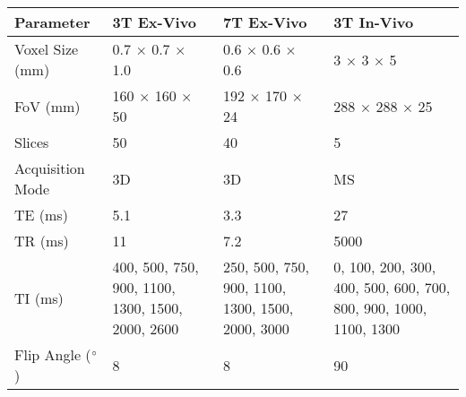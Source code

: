 \begin{table}[H]
	\centering
	\begin{tabularx}{1.0\textwidth}{X|X|X|X}
		\textbf{Parameter}                        & \textbf{3T Ex-Vivo}                                & \textbf{7T Ex-Vivo}                                & \textbf{3T In-Vivo}                                                \\ \hline
		Voxel Size (mm)                           & 0.7 $\times$ 0.7 $\times$ 1.0                                    & 0.6 $\times$ 0.6 $\times$ 0.6                                    & 3 $\times$ 3 $\times$ 5                                                          \\ \hline
		FoV (mm)                                  & 160 $\times$ 160 $\times$ 50                                     & 192 $\times$ 170 $\times$ 24                                     & 288 $\times$ 288 $\times$ 25                                                     \\ \hline
		Slices                                    & 50                                                 & 40                                                 & 5                                                                  \\ \hline
		Acquisition Mode                          & 3D                                                 & 3D                                                 & MS                                                                 \\ \hline
		TE (ms)                                   & 5.1                                                & 3.3                                                & 27                                                                 \\ \hline
		TR (ms)                                   & 11                                                 & 7.2                                                & 5000                                                               \\ \hline
		TI (ms)                                   & 400, 500, 750, 900,   1100, 1300, 1500, 2000, 2600 & 250, 500, 750, 900,   1100, 1300, 1500, 2000, 3000 & 0, 100, 200, 300,   400, 500, 600, 700, 800, 900, 1000, 1100, 1300 \\ \hline
		Flip Angle ($\degree$)                    & 8                                                  & 8                                                  & 90                                                                 \\ \hline

\end{tabularx}
\end{table}
